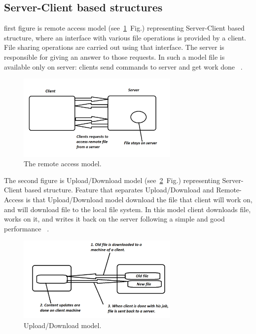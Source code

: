 \documentclass[a4paper,12pt,fleqn]{article}
\begin{document}
\subsection{Server-Client based structures}
 first figure is remote access model (see\ \ref{pav01}~Fig.) representing Server-Client based structure, where an interface with various file operations is provided by a client. File sharing operations are carried out using that interface. The server is responsible for giving an answer to those requests. In such a model file is available only on server: clients send commands to server and get work done ~\cite{levy1990distributed}. 
\bigskip
\begin{figure}[ht!]
    \centering
    \includegraphics[clip=true, width=0.7\textwidth]{Remote_access_model.PNG}
    \caption{The remote access model.}
    \label{pav01}
\end{figure}

The second figure is Upload/Download model (see\ \ref{pav02}~Fig.) representing Server-Client based structure. Feature that separates Upload/Download and Remote-Access is that Upload/Download model download the file that client will work on, and will download file to the local file system. In this model client downloads file, works on it, and writes it back on the server following a simple and good performance ~\cite{levy1990distributed}.

\begin{figure}[ht!]
    \centering
    \includegraphics[clip=true, width=0.7\textwidth]{UploadDownloadModel.PNG}
    \caption{Upload/Download model.}
    \label{pav02}
\end{figure}
\end{document}
